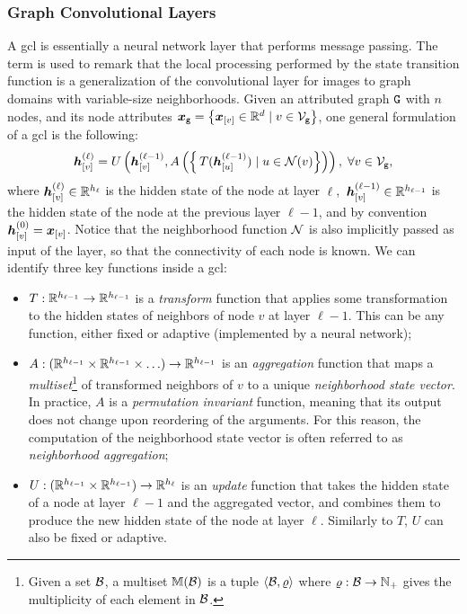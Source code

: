 \subsubsection*{Graph Convolutional Layers}\label{sec:graph-conv-layers}
A \gls{gcl} is essentially a neural network layer that performs message passing. The term  is used to remark that the local processing performed by the state transition function is a generalization of the convolutional layer for images to graph domains with variable-size neighborhoods. Given an attributed graph $\AttrGraph{g}$ with $n$ nodes, and its node attributes $\GraphFeatures{x}{g} = \Set{\Elem{x}{v} \in \Real^d \mid v \in \Nodes{g}}$, one general formulation of a \gls{gcl} is the following:
\begin{align}
    \label{eq:simple-aggregation}
    \StateVector{v}{\ell} = U \Par{\StateVector{v}{\ell-1}, A\Par{\Set{\,T(\StateVector{u}{\ell-1}) \mid u \in \Neigh(v)}}}, \; \forall v \in \Nodes{g},
\end{align}
where $\StateVector{v}{\ell} \in \Real^{h_\ell}$ is the hidden state of the node at layer $\ell$, $\,\StateVector{v}{\ell-1} \in \Real^{h_{\ell-1}}$ is the hidden state of the node at the previous layer $\ell-1$, and by convention $\StateVector{v}{0} = \Elem{x}{v}$. Notice that the neighborhood function $\Neigh$ is also implicitly passed as input of the layer, so that the connectivity of each node is known. We can identify three key functions inside a \gls{gcl}:
\begin{itemize}
    \item $T: \mathbb{R}^{h_{\ell-1}} \rightarrow \mathbb{R}^{h_{\ell-1}}$ is a \emph{transform} function that applies some transformation to the hidden states of neighbors of node $v$ at layer $\ell-1$. This can be any function, either fixed or adaptive (implemented by a neural network);
    \item $A: (\mathbb{R}^{h_{\ell-1}} \times \mathbb{R}^{h_{\ell-1}} \times \ldots) \rightarrow \mathbb{R}^{h_{\ell-1}}$ is an \emph{aggregation} function that maps a \emph{multiset}\footnote{Given a set $\Cal{B}$, a multiset $\Multiset(\Cal{B})$ is a tuple $\Tuple{\Cal{B}, \varrho}$ where $\varrho: \Cal{B} \shortrightarrow \Natural_+$ gives the multiplicity of each element in $\Cal{B}$.} of transformed neighbors of $v$ to a unique \emph{neighborhood state vector}. In practice, $A$ is a \emph{permutation invariant} function, meaning that its output does not change upon reordering of the arguments. For this reason, the computation of the neighborhood state vector is often referred to as \emph{neighborhood aggregation};
    \item $U: (\mathbb{R}^{h_{\ell-1}} \times \mathbb{R}^{h_{\ell-1}}) \rightarrow \mathbb{R}^{h_{\ell}}$ is an \emph{update} function that takes the hidden state of a node at layer $\ell-1$ and the aggregated vector, and combines them to produce the new hidden state of the node at layer $\ell$. Similarly to $T$, $U$ can also be fixed or adaptive.
\end{itemize}
